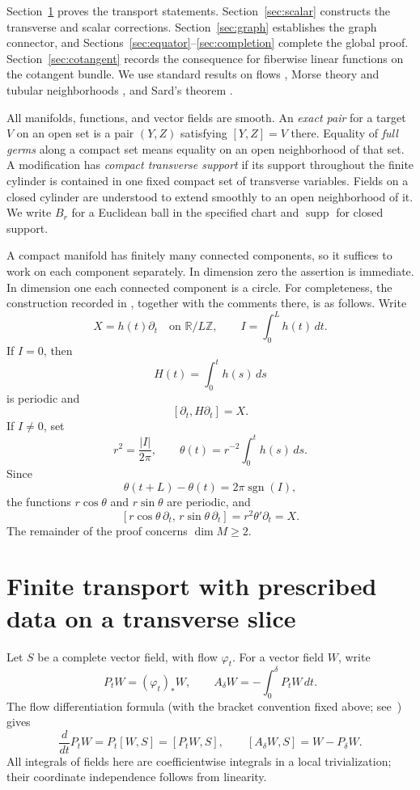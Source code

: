 \documentclass[11pt]{article}
\theoremstyle{remark}
\begin{document}
Section~\ref{sec:transport} proves the transport statements. Section~\ref{sec:scalar} constructs the transverse and scalar corrections. Section~\ref{sec:graph} establishes the graph connector, and Sections~\ref{sec:equator}--\ref{sec:completion} complete the global proof. Section~\ref{sec:cotangent} records the consequence for fiberwise linear functions on the cotangent bundle. We use standard results on flows \cite[Chapter~9]{Lee2013}, Morse theory and tubular neighborhoods \cite{Hirsch1976}, and Sard's theorem \cite{Sard1942}.

All manifolds, functions, and vector fields are smooth. An \emph{exact pair} for a target $V$ on an open set is a pair $(Y, Z)$ satisfying $[Y, Z]=V$ there. Equality of \emph{full germs} along a compact set means equality on an open neighborhood of that set. A modification has \emph{compact transverse support} if its support throughout the finite cylinder is contained in one fixed compact set of transverse variables. Fields on a closed cylinder are understood to extend smoothly to an open neighborhood of it. We write $B_r$ for a Euclidean ball in the specified chart and $\operatorname{supp}$ for closed support.

A compact manifold has finitely many connected components, so it suffices to work on each component separately. In dimension zero the assertion is immediate. In dimension one each connected component is a circle. For completeness, the construction recorded in \cite{Greilhuber2021}, together with the comments there,
is as follows. Write
$$
    X=h(t)\partial_t
    \quad\text{on }\mathbb{R}/L\mathbb{Z},
    \qquad
    I=\int_0^L h(t)\,dt.
$$
If $I=0$, then
$$
    H(t)=\int_0^t h(s)\,ds
$$
is periodic and
$$
    [\partial_t,H\partial_t]=X.
$$
If $I\neq0$, set
$$
    r^2=\frac{|I|}{2\pi},
    \qquad
    \theta(t)=r^{-2}\int_0^t h(s)\,ds.
$$
Since
$$
    \theta(t+L)-\theta(t)
    =
    2\pi\operatorname{sgn}(I),
$$
the functions $r\cos\theta$ and $r\sin\theta$ are periodic,
and
$$
    [r\cos\theta\,\partial_t,\,
     r\sin\theta\,\partial_t]
    =
    r^2\theta'\partial_t
    =
    X.
$$
The remainder of the proof concerns $\dim M\geq2$.


\section{Finite transport with prescribed data on a transverse slice}\label{sec:transport}

Let $S$ be a complete vector field, with flow $\varphi_t$. For a vector field $W$, write
$$
 P_tW=(\varphi_t)_*W,\qquad
 A_\delta W=-\int_0^\delta P_tW\,dt.
$$
The flow differentiation formula (with the bracket convention fixed above; see~\cite[Chapter~9]{Lee2013}) gives
\begin{equation}
    \frac{d}{dt}P_tW=P_t[W,S]=[P_tW,S],
 \qquad [A_\delta W,S]=W-P_\delta W. \tag{2.1}\label{eq:transport}
\end{equation}
All integrals of fields here are coefficientwise integrals in a local trivialization; their coordinate independence follows from linearity.
\end{document}
